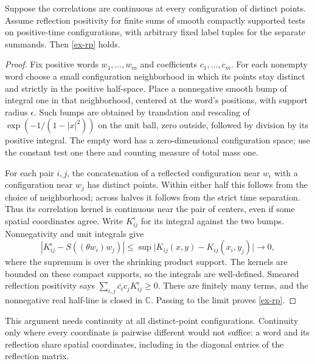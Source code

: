 \begin{lemma}\label{ex-rp-bumps}
Suppose the correlations are continuous at every configuration of distinct
points. Assume reflection positivity for finite sums of smooth compactly
supported tests on positive-time configurations, with arbitrary fixed label
tuples for the separate summands. Then \eqref{ex-rp} holds.
\end{lemma}
\begin{proof}
Fix positive words \(w_1,\ldots,w_m\) and coefficients
\(c_1,\ldots,c_m\). For each nonempty word choose a small configuration
neighborhood in which its points stay distinct and strictly in the positive
half-space. Place a nonnegative smooth bump of integral one in that
neighborhood, centered at the word's positions, with support radius
\(\epsilon\). Such bumps are obtained by translation and rescaling of
\(\exp(-1/(1-|x|^2))\) on the unit ball, zero outside, followed by
division by its positive integral. The empty word has a zero-dimensional
configuration space; use the constant test one there and counting measure
of total mass one.

For each pair \(i,j\), the concatenation of a reflected configuration
near \(w_i\) with a configuration near \(w_j\) has distinct points.
Within either half this follows from the choice of neighborhood; across
halves it follows from the strict time separation. Thus its correlation
kernel is continuous near the pair of centers, even if some spatial
coordinates agree. Write \(K_{ij}^{\epsilon}\) for its integral against
the two bumps. Nonnegativity and unit integrals give
\[
 |K_{ij}^{\epsilon}-S((\theta w_i)w_j)|
 \le \sup\bigl|K_{ij}(x,y)-K_{ij}(x_i,y_j)\bigr|\longrightarrow0,
\]
where the supremum is over the shrinking product support. The kernels are
bounded on these compact supports, so the integrals are well-defined.
Smeared reflection positivity says
\(\sum_{i,j}\overline{c_i}c_jK_{ij}^{\epsilon}\ge0\).
There are finitely many terms, and the nonnegative real half-line is closed
in \(\mathbb C\). Passing to the limit proves \eqref{ex-rp}.
\end{proof}

This argument needs continuity at all distinct-point configurations.
Continuity only where every coordinate is pairwise different would not
suffice: a word and its reflection share spatial coordinates, including in
the diagonal entries of the reflection matrix.

